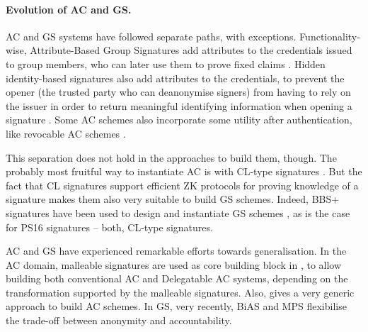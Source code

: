 \paragraph{Evolution of AC and GS.} %
AC and GS systems have followed separate paths, with exceptions.
Functionality-wise, Attribute-Based Group Signatures add attributes to the
credentials issued to group members, who can later use them to prove fixed
claims \cite{emo09,aa14}. Hidden identity-based signatures also add attributes
to the credentials, to prevent the opener (the trusted party who
can deanonymise signers) from having to rely on the issuer in order to return
meaningful identifying information when opening a signature \cite{ks07}. Some AC
schemes also incorporate some utility after authentication, like
revocable AC schemes \cite{cks10}.

This separation does not hold in the approaches to build them, though. The
probably most fruitful way to instantiate AC is with CL-type signatures
\cite{cl02}. But the fact that CL signatures support efficient ZK protocols for
proving knowledge of a signature makes them also very suitable to build GS
schemes. Indeed, BBS+ signatures \cite{bbs04,cdl16b} have been used to design
and instantiate GS schemes \cite{gl19,dl21}, as is the case for PS16 signatures
\cite{ps16,cdl+20} -- both, CL-type signatures.

AC and GS have experienced remarkable efforts towards generalisation. In
the AC domain, malleable signatures are used as core building block in
\cite{cklm14}, to allow building both conventional AC and Delegatable AC
systems, depending on the transformation supported by the malleable signatures.
Also, \cite{ckl+15} gives a very generic approach to build AC schemes. In GS,
very recently, BiAS \cite{lnpy21} and MPS \cite{ngsy22} flexibilise the
trade-off between anonymity and accountability.

